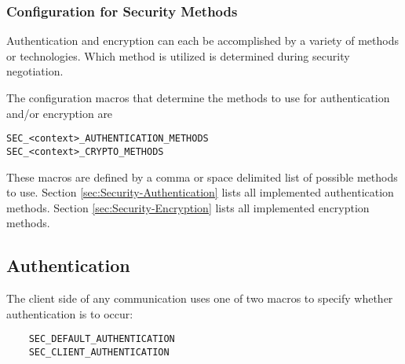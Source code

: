\subsubsection{\label{sec:security-negotiation-methods}Configuration for 
Security Methods}

Authentication and encryption can each be accomplished by a variety
of methods or technologies.
Which method is utilized is determined during
security negotiation.

The configuration macros that determine the methods
to use for authentication and/or encryption are
\begin{verbatim}
SEC_<context>_AUTHENTICATION_METHODS
SEC_<context>_CRYPTO_METHODS
\end{verbatim}

These macros are defined by a comma or space delimited list of
possible methods to use.
Section \ref{sec:Security-Authentication} lists all implemented
authentication methods.
Section \ref{sec:Security-Encryption} lists all implemented
encryption methods.



\subsection{\label{sec:Security-Authentication}Authentication}

The client side of any communication uses one of two macros
to specify whether authentication is to occur:
\begin{verbatim}
    SEC_DEFAULT_AUTHENTICATION
    SEC_CLIENT_AUTHENTICATION
\end{verbatim}

